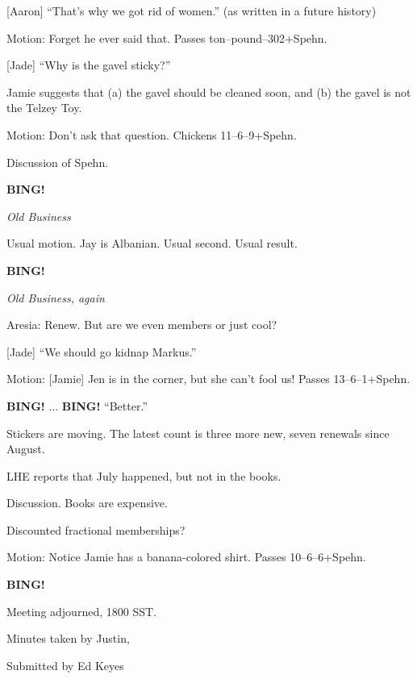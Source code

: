 \documentclass[12pt]{article}
\newcommand{\bing}{{\bf BING!} }
\newcommand{\goto}[1]{\bing \vskip 12pt \centerline{{\em{#1}}}}
\begin{document}
[Aaron] ``That's why we got rid of women.'' (as written in a future
history)

Motion: Forget he ever said that.  Passes ton--pound--302+Spehn.

[Jade] ``Why is the gavel sticky?''

Jamie suggests that (a) the gavel should be cleaned soon, and (b) the
gavel is not the Telzey Toy.

Motion: Don't ask that question.  Chickens 11--6--9+Spehn.

Discussion of Spehn.

\goto{Old Business}

Usual motion.  Jay is Albanian.  Usual second.  Usual result.

\goto{Old Business, again}

Aresia: Renew.  But are we even members or just cool?

[Jade] ``We should go kidnap Markus.''

Motion: [Jamie] Jen is in the corner, but she can't fool us!  Passes
13--6--1+Spehn.

\bing ... \bing  ``Better.''

Stickers are moving.  The latest count is three more new, seven
renewals since August.

LHE reports that July happened, but not in the books.

Discussion.  Books are expensive.

Discounted fractional memberships?

Motion: Notice Jamie has a banana-colored shirt.  Passes 10--6--6+Spehn.

\bing

\vspace{12pt}

\noindent
Meeting adjourned, 1800 SST.

\vspace{18pt}

\centerline{Minutes taken by Justin,}
\centerline{Submitted by Ed Keyes}
\end{document}
